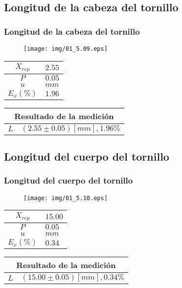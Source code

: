 \documentclass[letter,11pt]{beamer}
\begin{document}
\subsection{Longitud de la cabeza del tornillo}
\begin{frame}
\frametitle{Longitud de la cabeza del tornillo}
\vspace*{0.8cm}
\begin{figure}
\centering
\texttt{[image: img/01\_5.09.eps]}
\end{figure}
\vspace*{0.4cm}
\scriptsize
\begin{tabular}{|c|>{\centering}m{1.8cm}<{\centering}|}
\hline
$X_{rep}$ &   $2.55$ \tabularnewline \hline
      $P$ &   $0.05$ \tabularnewline \hline
      $u$ &     $mm$ \tabularnewline \hline
$E_x(\%)$ &   $1.96$ \tabularnewline \hline
\end{tabular}
\quad
\begin{tabular}{|c|>{\centering}m{5.7cm}<{\centering}|}
\hline
\multicolumn{2}{|c|}{\textbf{Resultado de la medición}} \\ \hline
$L$ & $( 2.55\pm0.05)[mm], 1.96\%$ \tabularnewline \hline
\end{tabular}
\end{frame}

\subsection{Longitud del cuerpo del tornillo}
\begin{frame}
\frametitle{Longitud del cuerpo del tornillo}
\vspace*{0.8cm}
\begin{figure}
\centering
\texttt{[image: img/01\_5.10.eps]}
\end{figure}
\vspace*{0.4cm}
\scriptsize
\begin{tabular}{|c|>{\centering}m{1.8cm}<{\centering}|}
\hline
$X_{rep}$ &  $15.00$ \tabularnewline \hline
      $P$ &   $0.05$ \tabularnewline \hline
      $u$ &     $mm$ \tabularnewline \hline
$E_x(\%)$ &   $0.34$ \tabularnewline \hline
\end{tabular}
\quad
\begin{tabular}{|c|>{\centering}m{5.7cm}<{\centering}|}
\hline
\multicolumn{2}{|c|}{\textbf{Resultado de la medición}} \\ \hline
$L$ & $( 15.00\pm0.05)[mm], 0.34\%$ \tabularnewline \hline
\end{tabular}
\end{frame}
\end{document}
